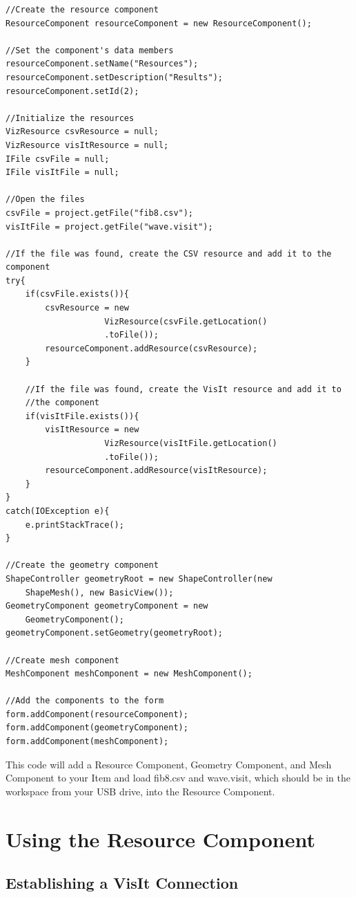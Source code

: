 \documentclass{article}
\begin{document}
\begin{verbatim}
//Create the resource component
ResourceComponent resourceComponent = new ResourceComponent();

//Set the component's data members
resourceComponent.setName("Resources");
resourceComponent.setDescription("Results");
resourceComponent.setId(2);

//Initialize the resources
VizResource csvResource = null;
VizResource visItResource = null;
IFile csvFile = null;
IFile visItFile = null;

//Open the files
csvFile = project.getFile("fib8.csv");
visItFile = project.getFile("wave.visit");

//If the file was found, create the CSV resource and add it to the component
try{
	if(csvFile.exists()){
		csvResource = new 
                    VizResource(csvFile.getLocation()
                    .toFile());
    	resourceComponent.addResource(csvResource);
	}
		        
	//If the file was found, create the VisIt resource and add it to 
	//the component
	if(visItFile.exists()){
		visItResource = new 
                    VizResource(visItFile.getLocation()
                    .toFile());
		resourceComponent.addResource(visItResource);
	}
}
catch(IOException e){
	e.printStackTrace();
}

//Create the geometry component
ShapeController geometryRoot = new ShapeController(new
    ShapeMesh(), new BasicView());
GeometryComponent geometryComponent = new 
    GeometryComponent();
geometryComponent.setGeometry(geometryRoot);

//Create mesh component
MeshComponent meshComponent = new MeshComponent();

//Add the components to the form
form.addComponent(resourceComponent);
form.addComponent(geometryComponent);
form.addComponent(meshComponent);	
\end{verbatim}

This code will add a Resource Component, Geometry Component, and Mesh Component
to your Item and load fib8.csv and wave.visit, which should be in the workspace
from your USB drive, into the Resource Component.


\section{Using the Resource Component}

\subsection{Establishing a VisIt Connection}
\end{document}
